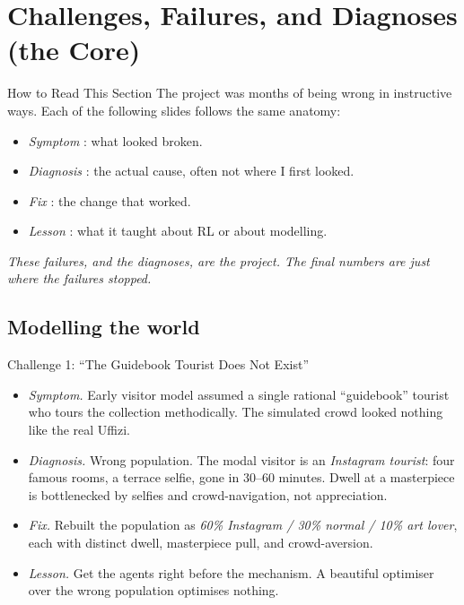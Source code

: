\documentclass[aspectratio=169, 11pt]{beamer}
\newcommand{\good}[1]{\textcolor{safegreen}{#1}}
\newcommand{\bad}[1]{\textcolor{crowdred}{#1}}
\newcommand{\warn}[1]{\textcolor{warnorange}{#1}}
\newcommand{\emp}[1]{\textit{#1}}
\newcommand{\sdfl}[4]{%
\begin{itemize}\setlength\itemsep{2pt}
\item[\bad{\textbf{S}}] \emp{Symptom.} #1
\item[\warn{\textbf{D}}] \emp{Diagnosis.} #2
\item[\good{\textbf{F}}] \emp{Fix.} #3
\item[\textbf{L}] \emp{Lesson.} #4
\end{itemize}}
\begin{document}
\section{Challenges, Failures, and Diagnoses (the Core)}

\begin{frame}{How to Read This Section}
\footnotesize
The project was months of being wrong in instructive ways. Each of the following
slides follows the same anatomy:
\vspace{0.5em}
\begin{itemize}\setlength\itemsep{4pt}
\item[\bad{\textbf{S}}] \emp{Symptom} : what looked broken.
\item[\warn{\textbf{D}}] \emp{Diagnosis} : the actual cause, often not where I first looked.
\item[\good{\textbf{F}}] \emp{Fix} : the change that worked.
\item[\textbf{L}] \emp{Lesson} : what it taught about RL or about modelling.
\end{itemize}
\vspace{0.6em}
\begin{center}
\emp{These failures, and the diagnoses, are the project. The final numbers are just
where the failures stopped.}
\end{center}
\end{frame}

\subsection*{Modelling the world}

\begin{frame}{Challenge 1: ``The Guidebook Tourist Does Not Exist''}
\footnotesize
\sdfl
{Early visitor model assumed a single rational ``guidebook'' tourist who tours the
collection methodically. The simulated crowd looked nothing like the real Uffizi.}
{Wrong population. The modal visitor is an \emp{Instagram tourist}: four famous rooms,
a terrace selfie, gone in 30--60 minutes. Dwell at a masterpiece is bottlenecked by
selfies and crowd-navigation, not appreciation.}
{Rebuilt the population as \emp{60\% Instagram / 30\% normal / 10\% art lover}, each with
distinct dwell, masterpiece pull, and crowd-aversion.}
{Get the agents right before the mechanism. A beautiful optimiser over the wrong
population optimises nothing.}
\end{frame}
\end{document}
